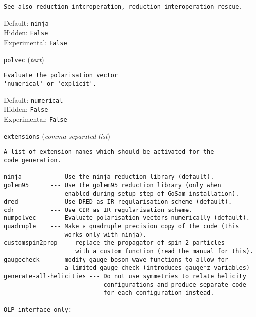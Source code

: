 \begin{basedescript}{\desclabelstyle{\pushlabel}}
\begin{verbatim}
See also reduction_interoperation, reduction_interoperation_rescue.
\end{verbatim}
Default: \verb|ninja|
\\Hidden: \verb|False|
\\Experimental: \verb|False|
\\\item[\colorbox{gray!30}{\texttt{polvec}}] (\textit{text})
\begin{verbatim}
Evaluate the polarisation vector
'numerical' or 'explicit'.
\end{verbatim}
Default: \verb|numerical|
\\Hidden: \verb|False|
\\Experimental: \verb|False|
\\\item[\colorbox{gray!30}{\texttt{extensions}}] (\textit{comma separated list})
\begin{verbatim}
A list of extension names which should be activated for the
code generation.

ninja        --- Use the ninja reduction library (default).
golem95      --- Use the golem95 reduction library (only when
                 enabled during setup step of GoSam installation).
dred         --- Use DRED as IR regularisation scheme (default).
cdr          --- Use CDR as IR regularisation scheme.
numpolvec    --- Evaluate polarisation vectors numerically (default).
quadruple    --- Make a quadruple precision copy of the code (this
                 works only with ninja).
customspin2prop --- replace the propagator of spin-2 particles
                    with a custom function (read the manual for this).
gaugecheck   --- modify gauge boson wave functions to allow for
                 a limited gauge check (introduces gauge*z variables)
generate-all-helicities --- Do not use symmetries to relate helicity
                            configurations and produce separate code
                            for each configuration instead.

OLP interface only:


\end{verbatim}
\end{basedescript}
